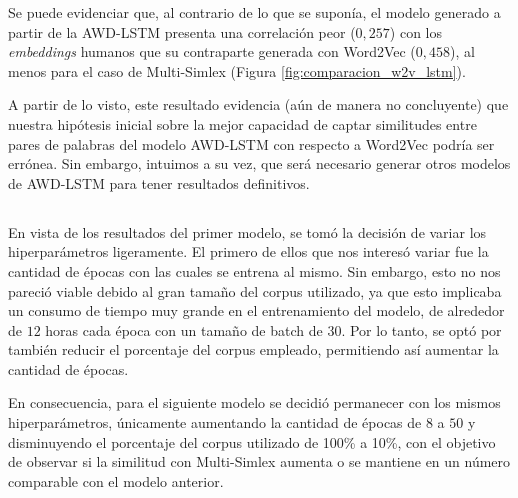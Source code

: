 Se puede evidenciar que, al contrario de lo que se suponía, el modelo generado a partir 
de la AWD-LSTM presenta una correlación peor ($0,257$) con los \textit{embeddings} humanos que su 
contraparte generada con Word2Vec ($0,458$), al menos para el caso de Multi-Simlex (Figura \ref{fig:comparacion_w2v_lstm}).


A partir de lo visto, este resultado evidencia (aún de manera no concluyente) que nuestra 
hipótesis inicial sobre la mejor capacidad de captar similitudes entre pares de palabras 
del modelo AWD-LSTM con respecto a Word2Vec podría ser errónea. Sin embargo, 
intuimos a su vez, que será necesario generar otros modelos de AWD-LSTM para tener 
resultados definitivos.

\subsection{}
\subsubsection{}

En vista de los resultados del primer modelo, se tomó la decisión de variar los hiperparámetros 
ligeramente. El primero de ellos que nos interesó variar fue la cantidad de épocas con las 
cuales se entrena al mismo. Sin embargo, esto no nos pareció viable debido al gran tamaño 
del corpus utilizado, ya que esto implicaba un consumo de tiempo muy grande en el entrenamiento 
del modelo, de alrededor de $12$ horas cada época con un tamaño de batch de $30$. Por lo tanto, 
se optó por también reducir el porcentaje del corpus empleado, permitiendo así aumentar la 
cantidad de épocas.

En consecuencia, para el siguiente modelo se decidió permanecer con los mismos hiperparámetros, 
únicamente aumentando la cantidad de épocas de $8$ a $50$ y disminuyendo el porcentaje del corpus 
utilizado de 100\% a 10\%, con el objetivo de observar si la similitud con Multi-Simlex 
aumenta o se mantiene en un número comparable con el modelo anterior.

